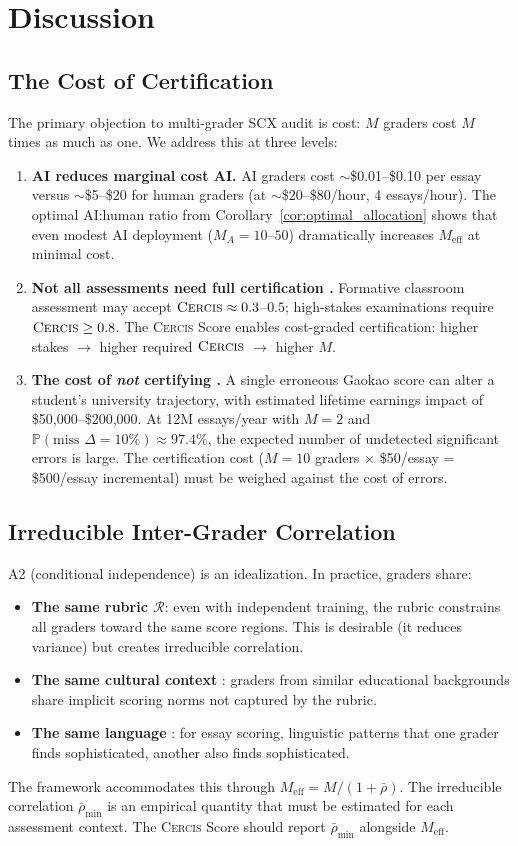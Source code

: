 \documentclass[11pt,a4paper]{article}
\theoremstyle{definition}
\theoremstyle{remark}
\newcommand{\Cercis}{\textsc{Cercis}}
\newcommand{\Pbb}{\mathbb{P}}
\newcommand{\cR}{\mathcal{R}}
\newcommand{\rubric}{\cR}
\begin{document}
\section{Discussion}
\label{sec:discussion}
\subsection{The Cost of Certification}
The primary objection to multi-grader SCX audit is cost: $M$ graders cost $M$ times as much as one. We address this at three levels:
\begin{enumerate}[label=(\roman*)]
    \item \textbf{AI reduces marginal cost AI.} AI graders cost $\sim$\$0.01--\$0.10 per essay versus $\sim$\$5--\$20 for human graders (at $\sim$\$20--\$80/hour, 4 essays/hour). The optimal AI:human ratio from Corollary~\ref{cor:optimal_allocation} shows that even modest AI deployment ($M_A = 10$--$50$) dramatically increases $M_{\text{eff}}$ at minimal cost.
    \item \textbf{Not all assessments need full certification .} Formative classroom assessment may accept $\Cercis \approx 0.3$--$0.5$; high-stakes examinations require $\Cercis \ge 0.8$. The \Cercis{} Score enables cost-graded certification: higher stakes $\to$ higher required $\Cercis$ $\to$ higher $M$.
    \item \textbf{The cost of \textit{not} certifying .} A single erroneous Gaokao score can alter a student's university trajectory, with estimated lifetime earnings impact of \$50,000--\$200,000. At 12M essays/year with $M=2$ and $\Pbb(\text{miss } \Delta=10\%) \approx 97.4\%$, the expected number of undetected significant errors is large. The certification cost ($M=10$ graders $\times$ \$50/essay = \$500/essay incremental) must be weighed against the cost of errors.
\end{enumerate}
\subsection{Irreducible Inter-Grader Correlation}
A2 (conditional independence) is an idealization. In practice, graders share:
\begin{itemize}[nosep]
    \item \textbf{The same rubric $\rubric$}: even with independent training, the rubric constrains all graders toward the same score regions. This is desirable (it reduces variance) but creates irreducible correlation.
    \item \textbf{The same cultural context }: graders from similar educational backgrounds share implicit scoring norms not captured by the rubric.
    \item \textbf{The same language }: for essay scoring, linguistic patterns that one grader finds sophisticated, another also finds sophisticated.
\end{itemize}
The framework accommodates this through $M_{\text{eff}} = M/(1 + \bar{\rho})$. The irreducible correlation $\bar{\rho}_{\min}$ is an empirical quantity that must be estimated for each assessment context. The \Cercis{} Score should report $\bar{\rho}_{\min}$ alongside $M_{\text{eff}}$.
\end{document}
